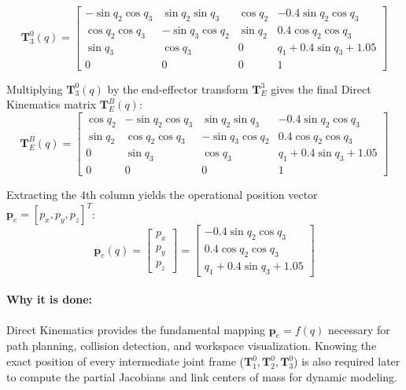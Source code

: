 \documentclass[11pt, a4paper]{article}
\begin{document}
\begin{equation}
\mathbf{T}_3^0(q) = \begin{bmatrix}
-\sin q_2 \cos q_3 & \sin q_2 \sin q_3 & \cos q_2 & -0.4 \sin q_2 \cos q_3 \\
\cos q_2 \cos q_3 & -\sin q_3 \cos q_2 & \sin q_2 & 0.4 \cos q_2 \cos q_3 \\
\sin q_3 & \cos q_3 & 0 & q_1 + 0.4 \sin q_3 + 1.05 \\
0 & 0 & 0 & 1
\end{bmatrix}
\end{equation}

Multiplying $\mathbf{T}_3^0(q)$ by the end-effector transform $\mathbf{T}_E^3$ gives the final Direct Kinematics matrix $\mathbf{T}_E^B(q)$:
\begin{equation}
\mathbf{T}_E^B(q) = \begin{bmatrix}
\cos q_2 & -\sin q_2 \cos q_3 & \sin q_2 \sin q_3 & -0.4 \sin q_2 \cos q_3 \\
\sin q_2 & \cos q_2 \cos q_3 & -\sin q_3 \cos q_2 & 0.4 \cos q_2 \cos q_3 \\
0 & \sin q_3 & \cos q_3 & q_1 + 0.4 \sin q_3 + 1.05 \\
0 & 0 & 0 & 1
\end{bmatrix}
\end{equation}

Extracting the 4th column yields the operational position vector $\mathbf{p}_e = [p_x, p_y, p_z]^T$:
\begin{equation}
    \mathbf{p}_e(q) = \begin{bmatrix}
    p_x \\ p_y \\ p_z
    \end{bmatrix} = \begin{bmatrix}
    -0.4 \sin q_2 \cos q_3 \\
    0.4 \cos q_2 \cos q_3 \\
    q_1 + 0.4 \sin q_3 + 1.05
    \end{bmatrix}
\end{equation}

\paragraph{Why it is done:}
Direct Kinematics provides the fundamental mapping $\mathbf{p}_e = f(q)$ necessary for path planning, collision detection, and workspace visualization. Knowing the exact position of every intermediate joint frame ($\mathbf{T}_1^0, \mathbf{T}_2^0, \mathbf{T}_3^0$) is also required later to compute the partial Jacobians and link centers of mass for dynamic modeling.
\end{document}
